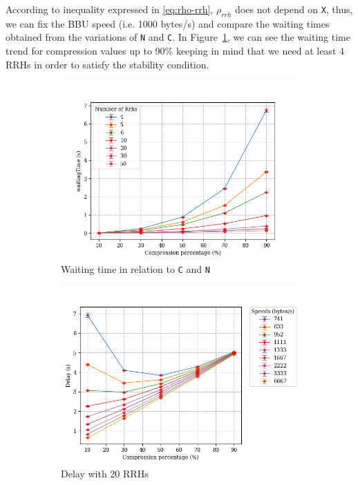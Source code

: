 \documentclass[11pt,a4paper,oneside, openright]{article}
\begin{document}
According to inequality expressed in \ref{eq:rho-rrh}, $ \rho_{rrh} $ does not depend on \texttt{X}, thus, we can fix the BBU speed (i.e. 1000 bytes/s) and compare the waiting times obtained from the variations of \texttt{N} and \texttt{C}. In Figure~\ref{fig:c-vs-waiting-1}, we can see the waiting time trend for compression values up to 90\% keeping in mind that we need at least 4 RRHs in order to satisfy the stability condition.

\begin{figure}
\centering
\begin{subfigure}{.5\textwidth}
  \centering
  \includegraphics[width=\linewidth]{images/c-vs-waiting}
  \caption{Waiting time in relation to \texttt{C} and \texttt{N}}
  \label{fig:c-vs-waiting-1}
\end{subfigure}%
\begin{subfigure}{.5\textwidth}
  \centering
  \includegraphics[width=\linewidth]{images/c-vs-delay}
  \caption{Delay with 20 RRHs}
  \label{fig:c-vs-delay}
\end{subfigure}
\caption{}
\label{fig:waiting-and-delay}
\end{figure}
\end{document}

